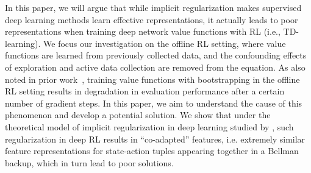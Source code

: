 In this paper, we will argue that while implicit regularization makes supervised deep learning methods learn effective representations, it actually leads to poor representations when training deep network value functions with RL (i.e., TD-learning). We focus our investigation on the offline RL setting, where value functions are learned from previously collected data, and the confounding effects of exploration and active data collection are removed from the equation. As also noted in prior work~\citep{kumar2021implicit}, training value functions with bootstrapping in the offline RL setting results in degradation in evaluation performance after a certain number of gradient steps. %
In this paper, we aim to understand the cause of this phenomenon and develop a potential solution. We show that under the theoretical model of implicit regularization in deep learning studied by \citet{blanc2020implicit},
such regularization in deep RL results in ``co-adapted'' features, i.e. extremely similar feature representations for state-action tuples appearing together in a Bellman backup, which in turn lead to poor solutions.

